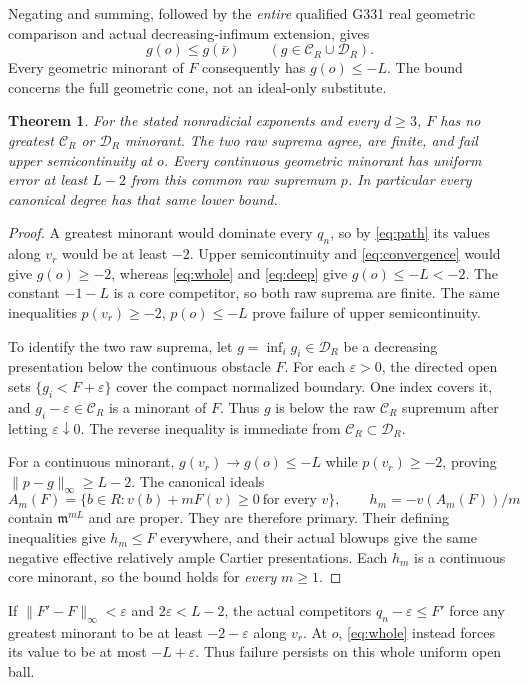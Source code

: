 \documentclass[11pt]{article}
\newtheorem{theorem}{Theorem}
\newcommand{\m}{\mathfrak m}
\newcommand{\Cc}{\mathcal C}
\newcommand{\Dd}{\mathcal D}
\begin{document}
Negating and summing, followed by the \emph{entire} qualified G331
real geometric comparison and actual decreasing-infimum extension, gives
\begin{equation}\label{eq:whole}
 g(o)\le g(\bar\nu)\qquad(g\in\Cc_R\cup\Dd_R).
\end{equation}
Every geometric minorant of $F$ consequently has $g(o)\le-L$.
The bound concerns the full geometric cone, not an ideal-only substitute.

\begin{theorem}\label{th:failure}
For the stated nonradicial exponents and every $d\ge3$, $F$ has
no greatest $\Cc_R$ or $\Dd_R$ minorant. The two raw suprema
agree, are finite, and fail upper semicontinuity at $o$.
Every continuous geometric minorant has uniform error at least $L-2$
from this common raw supremum $p$. In particular every canonical degree
has that same lower bound.
\end{theorem}
\begin{proof}
A greatest minorant would dominate every $q_n$, so by \eqref{eq:path}
its values along $v_r$ would be at least $-2$. Upper semicontinuity
and \eqref{eq:convergence} would give $g(o)\ge-2$, whereas
\eqref{eq:whole} and \eqref{eq:deep} give $g(o)\le-L<-2$.
The constant $-1-L$ is a core competitor, so both raw suprema
are finite. The same inequalities $p(v_r)\ge-2$, $p(o)\le-L$
prove failure of upper semicontinuity.

To identify the two raw suprema, let $g=\inf_i g_i\in\Dd_R$
be a decreasing presentation below the continuous obstacle $F$.
For each $\varepsilon>0$, the directed open sets
$\{g_i<F+\varepsilon\}$ cover the compact normalized boundary.
One index covers it, and $g_i-\varepsilon\in\Cc_R$ is a
minorant of $F$. Thus $g$ is below the raw $\Cc_R$ supremum
after letting $\varepsilon\downarrow0$. The reverse inequality
is immediate from $\Cc_R\subset\Dd_R$.

For a continuous minorant, $g(v_r)\to g(o)\le-L$ while
$p(v_r)\ge-2$, proving $\|p-g\|_\infty\ge L-2$.
The canonical ideals
\[
 A_m(F)=\{b\in R:v(b)+mF(v)\ge0\ \text{for every }v\},
 \qquad h_m=-v(A_m(F))/m
\]
contain $\m^{mL}$ and are proper. They are therefore primary.
Their defining inequalities give $h_m\le F$ everywhere, and
their actual blowups give the same negative effective relatively
ample Cartier presentations. Each $h_m$ is a continuous core
minorant, so the bound holds for \emph{every} $m\ge1$.
\end{proof}

If $\|F'-F\|_\infty<\varepsilon$ and $2\varepsilon<L-2$,
the actual competitors $q_n-\varepsilon\le F'$ force any greatest
minorant to be at least $-2-\varepsilon$ along $v_r$.
At $o$, \eqref{eq:whole} instead forces its value to be at most
$-L+\varepsilon$. Thus failure persists on this whole uniform open ball.
\end{document}
